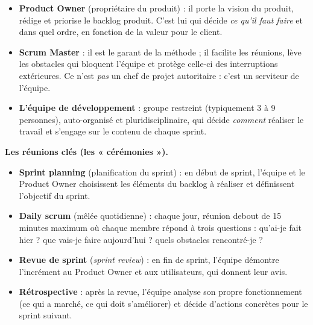\documentclass[11pt]{article}
\begin{document}
\begin{itemize}
  \item \textbf{Product Owner} (propriétaire du produit) : il porte la vision du produit, rédige et priorise le backlog produit. C'est lui qui décide \emph{ce qu'il faut faire} et dans quel ordre, en fonction de la valeur pour le client.
  \item \textbf{Scrum Master} : il est le garant de la méthode ; il facilite les réunions, lève les obstacles qui bloquent l'équipe et protège celle-ci des interruptions extérieures. Ce n'est \emph{pas} un chef de projet autoritaire : c'est un serviteur de l'équipe.
  \item \textbf{L'équipe de développement} : groupe restreint (typiquement 3 à 9 personnes), auto-organisé et pluridisciplinaire, qui décide \emph{comment} réaliser le travail et s'engage sur le contenu de chaque sprint.
\end{itemize}

\textbf{Les réunions clés (les « cérémonies »).}

\begin{itemize}
  \item \textbf{Sprint planning} (planification du sprint) : en début de sprint, l'équipe et le Product Owner choisissent les éléments du backlog à réaliser et définissent l'objectif du sprint.
  \item \textbf{Daily scrum} (mêlée quotidienne) : chaque jour, réunion debout de 15 minutes maximum où chaque membre répond à trois questions : qu'ai-je fait hier ? que vais-je faire aujourd'hui ? quels obstacles rencontré-je ?
  \item \textbf{Revue de sprint} (\emph{sprint review}) : en fin de sprint, l'équipe démontre l'incrément au Product Owner et aux utilisateurs, qui donnent leur avis.
  \item \textbf{Rétrospective} : après la revue, l'équipe analyse son propre fonctionnement (ce qui a marché, ce qui doit s'améliorer) et décide d'actions concrètes pour le sprint suivant.
\end{itemize}
\end{document}
